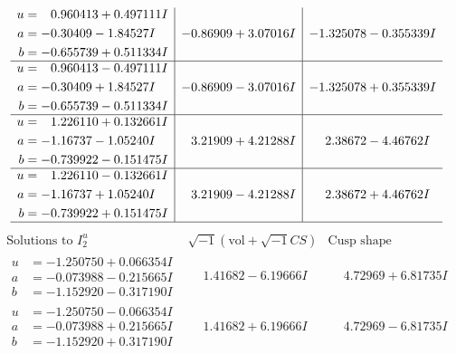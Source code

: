 \documentclass[1p]{elsarticle_modified}
\theoremstyle{definition}
\newcommand{\I}{\sqrt{-1}}
\begin{document}
$$\begin{array}{c|c|c}
\begin{aligned}
u &= \phantom{-}0.960413 + 0.497111 I \\
a &= -0.30409 - 1.84527 I \\
b &= -0.655739 + 0.511334 I\end{aligned}
 & -0.86909 + 3.07016 I & -1.325078 - 0.355339 I \\ \hline\begin{aligned}
u &= \phantom{-}0.960413 - 0.497111 I \\
a &= -0.30409 + 1.84527 I \\
b &= -0.655739 - 0.511334 I\end{aligned}
 & -0.86909 - 3.07016 I & -1.325078 + 0.355339 I \\ \hline\begin{aligned}
u &= \phantom{-}1.226110 + 0.132661 I \\
a &= -1.16737 - 1.05240 I \\
b &= -0.739922 - 0.151475 I\end{aligned}
 & \phantom{-}3.21909 + 4.21288 I & \phantom{-}2.38672 - 4.46762 I \\ \hline\begin{aligned}
u &= \phantom{-}1.226110 - 0.132661 I \\
a &= -1.16737 + 1.05240 I \\
b &= -0.739922 + 0.151475 I\end{aligned}
 & \phantom{-}3.21909 - 4.21288 I & \phantom{-}2.38672 + 4.46762 I\\
 \hline 
 \end{array}$$\newpage$$\begin{array}{c|c|c}  
\text{Solutions to }I^u_{2}& \I (\text{vol} + \sqrt{-1}CS) & \text{Cusp shape}\\
 \hline 
\begin{aligned}
u &= -1.250750 + 0.066354 I \\
a &= -0.073988 - 0.215665 I \\
b &= -1.152920 - 0.317190 I\end{aligned}
 & \phantom{-}1.41682 - 6.19666 I & \phantom{-}4.72969 + 6.81735 I \\ \hline\begin{aligned}
u &= -1.250750 - 0.066354 I \\
a &= -0.073988 + 0.215665 I \\
b &= -1.152920 + 0.317190 I\end{aligned}
 & \phantom{-}1.41682 + 6.19666 I & \phantom{-}4.72969 - 6.81735 I \\ \hline\begin{aligned}

\end{aligned}
\end{array}$$
\end{document}
